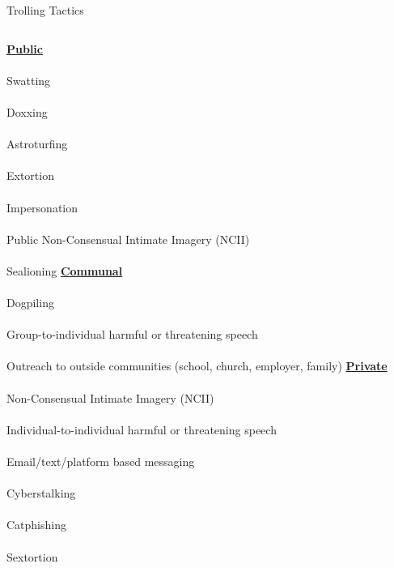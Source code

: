 \documentclass[nobackground,dvipsnames,table]{beamer}
\begin{document}
\begin{frame}{Trolling Tactics}
    \begin{columns}[T]
            \centering
            \large{\underline{\textbf{Public}}}\\~\\

            \small
            Swatting\\~\\
            Doxxing\\~\\
            Astroturfing\\~\\
            Extortion\\~\\
            Impersonation\\~\\
            Public Non-Consensual Intimate Imagery (NCII)\\~\\
            Sealioning
            \centering
            \large{\underline{\textbf{Communal}}}\\~\\

            \small
            Dogpiling\\~\\
            Group-to-individual harmful or threatening speech\\~\\
            Outreach to outside communities (school, church, employer, family)
            \centering
            \large{\underline{\textbf{Private}}}\\~\\

            \small
            Non-Consensual Intimate Imagery (NCII)\\~\\
            Individual-to-individual harmful or threatening speech\\~\\
            Email/text/platform based messaging\\~\\
            Cyberstalking\\~\\
            Catphishing\\~\\
            Sextortion
    \end{columns}
\end{frame}
\end{document}
